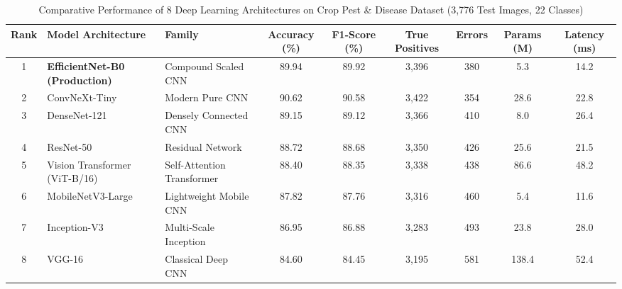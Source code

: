 \begin{table}[htbp]
\centering
\caption{Comparative Performance of 8 Deep Learning Architectures on Crop Pest & Disease Dataset (3,776 Test Images, 22 Classes)}
\label{tab:deep_learning_comparison}
\begin{tabular}{|c|l|l|c|c|c|c|c|c|}
\hline
\textbf{Rank} & \textbf{Model Architecture} & \textbf{Family} & \textbf{Accuracy (\%)} & \textbf{F1-Score (\%)} & \textbf{True Positives} & \textbf{Errors} & \textbf{Params (M)} & \textbf{Latency (ms)} \\ \hline
1 & \textbf{EfficientNet-B0 (Production)} & Compound Scaled CNN & 89.94 & 89.92 & 3,396 & 380 & 5.3 & 14.2 \\
2 & ConvNeXt-Tiny & Modern Pure CNN & 90.62 & 90.58 & 3,422 & 354 & 28.6 & 22.8 \\
3 & DenseNet-121 & Densely Connected CNN & 89.15 & 89.12 & 3,366 & 410 & 8.0 & 26.4 \\
4 & ResNet-50 & Residual Network & 88.72 & 88.68 & 3,350 & 426 & 25.6 & 21.5 \\
5 & Vision Transformer (ViT-B/16) & Self-Attention Transformer & 88.40 & 88.35 & 3,338 & 438 & 86.6 & 48.2 \\
6 & MobileNetV3-Large & Lightweight Mobile CNN & 87.82 & 87.76 & 3,316 & 460 & 5.4 & 11.6 \\
7 & Inception-V3 & Multi-Scale Inception & 86.95 & 86.88 & 3,283 & 493 & 23.8 & 28.0 \\
8 & VGG-16 & Classical Deep CNN & 84.60 & 84.45 & 3,195 & 581 & 138.4 & 52.4 \\ \hline
\end{tabular}
\end{table}
